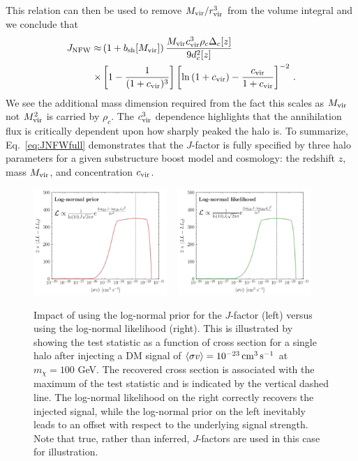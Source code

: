 This relation can then be used to remove $M_{\rm vir}/r_{\rm vir}^3$ from the volume integral and we conclude that
\begin{align}
J_{\rm NFW} \approx &\left(1+b_\text{sh}[M_\text{vir}]\right) \frac{M_{\rm vir} c_{\rm vir}^3 \rho_c \Delta_c[z]}{9 d_c^2[z]} \label{eq:JNFWfull} \\
\times &\left[ 1 - \frac{1}{(1+c_{\rm vir})^3} \right] \left[ \ln \left( 1 + c_{\rm vir} \right) - \frac{c_{\rm vir}}{1+c_{\rm vir}} \right]^{-2}\,. \notag
\end{align}
We see the additional mass dimension required from the fact this scales as $M_{\rm vir}$ not $M_{\rm vir}^2$ is carried by $\rho_c$. The $c_{\rm vir}^3$ dependence highlights that the annihilation flux is critically dependent upon how sharply peaked the halo is.   To summarize, Eq.~\ref{eq:JNFWfull} demonstrates that the $J$-factor is fully specified by three halo parameters for a given substructure boost model and cosmology: the redshift $z$, mass $M_{\rm vir}$, and concentration $c_{\rm vir}$.

\begin{figure}[t]
   \centering
   \includegraphics[width=0.45\textwidth]{ch-darksky/plots//jfactor_wrongLL.pdf}  ~\hspace{2mm}
   \includegraphics[width=0.45\textwidth]{ch-darksky/plots//jfactor_correctLL.pdf} 
   \caption{Impact of using the log-normal prior for the $J$-factor (left) versus using the log-normal likelihood (right).  This is illustrated by showing the test statistic as a function of cross section for a single halo after injecting a DM signal of $\langle\sigma v \rangle= 10^{-23}\,{\rm cm}^3\,{\rm s}^{-1}$ at $m_\chi =100$ GeV. The recovered cross section is   associated with the maximum of the test statistic and is indicated by the vertical dashed line. The log-normal likelihood on the right correctly recovers the injected signal, while the log-normal prior on the left inevitably leads to an offset with respect to the underlying signal strength. Note that true, rather than inferred, $J$-factors are used in this case for illustration.}
   \label{fig:LLJfacForms}
\end{figure}

